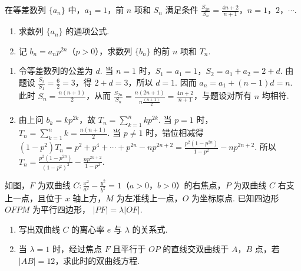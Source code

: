 \begin{problem}
在等差数列 \(\{a_{n}\}\) 中，\(a_{1} = 1\)，前 \(n\) 项和 \(S_{n}\) 满足条件 \(\frac{S_{2n}}{S_{n}} = \frac{4n + 2}{n + 1}\)，\(n = 1\)，\(2\)，\(\cdots\).

\begin{enumerate}
\item 求数列 \(\{a_{n}\}\) 的通项公式.
\item 记 \( b_n = a_n p^{2n} \)（\(p > 0\)），求数列 \(\{b_n\}\) 的前 \(n\) 项和 \( T_n \).
\end{enumerate}
\end{problem}

\begin{solution}
\begin{enumerate}
\item 令等差数列的公差为 \(d\). 当 \(n=1\) 时，\(S_1=a_1=1\)，\(S_2=a_1+a_2=2+d\). 由题设 \(\frac{S_2}{S_1}=\frac{6}{2}=3\)，得 \(2+d=3\)，所以 \(d=1\). 因而 \(a_n=a_1+(n-1)d=n\). 此时 \(S_n=\frac{n(n+1)}2\)，从而 \(\frac{S_{2n}}{S_n}=\frac{n(2n+1)}{n\frac{(n+1)}{2}}=\frac{4n+2}{n+1}\)，与题设对所有 \(n\) 均相符.
\item 由上问 \(b_k=kp^{2k}\)，故 \(T_n=\sum_{k=1}^nkp^{2k}\). 当 \(p=1\) 时，\(T_n=\sum_{k=1}^nk=\frac{n(n+1)}2\). 当 \(p\ne1\) 时，错位相减得
\((1-p^2)T_n=p^2+p^4+\cdots+p^{2n}-np^{2n+2}=\frac{p^2(1-p^{2n})}{1-p^2}-np^{2n+2}\). 所以
\(T_n=\frac{p^2(1-p^{2n})}{(1-p^2)^2}-\frac{np^{2n+2}}{1-p^2}\).
\end{enumerate}
\end{solution}

\begin{problem}
如图，\(F\) 为双曲线 \( C: \frac{x^{2}}{a^{2}} - \frac{y^{2}}{b^{2}} = 1 \)（\(a > 0\)，\(b > 0\)）的右焦点，\(P\) 为双曲线 \(C\) 右支上一点，且位于 \(x\) 轴上方，\(M\) 为左准线上一点，\(O\) 为坐标原点. 已知四边形 \(OFPM\) 为平行四边形， \( |PF| = \lambda |OF| \).

\begin{enumerate}
\item 写出双曲线 \(C\) 的离心率 \(e\) 与 \(\lambda\) 的关系式.
\item 当 \(\lambda = 1\) 时，经过焦点 \(F\) 且平行于 \(OP\) 的直线交双曲线于 \(A\)，\(B\) 点，若 \(|AB| = 12\)，求此时的双曲线方程.
\end{enumerate}

\end{problem}

